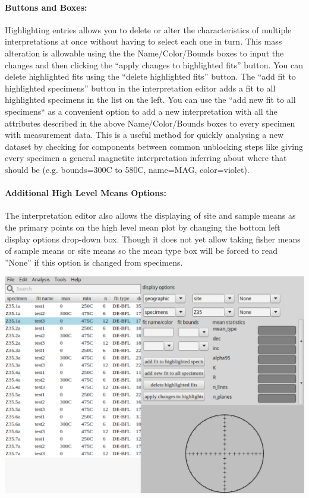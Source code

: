 \documentclass[11pt]{book}
\begin{document}
{\paragraph{Buttons and Boxes:}\label{IE-buttons} Highlighting entries allows you to delete or alter the characteristics of multiple interpretations at once without having to select each one in turn. This mass alteration is allowable using the the Name/Color/Bounds boxes to input the changes and then clicking the ``apply changes to highlighted fits'' button. You can delete highlighted fits using the ``delete highlighted fits'' button. The ``add fit to highlighted specimens'' button in the interpretation editor adds a fit to all highlighted specimens in the list on the left. You can use the ``add new fit to all specimens`` as a convenient option to add a new interpretation with all the attributes described in the above Name/Color/Bounds boxes to every specimen with measurement data. This is a useful method for quickly analysing a new dataset by checking for components between common unblocking steps like giving every specimen a general magnetite interpretation inferring about where that should be (e.g. bounds=300C to 580C, name=MAG, color=violet).
\paragraph{Additional High Level Means Options:}\label{IE-HLM-options} The interpretation editor also allows the displaying of site and sample means as the primary points on the high level mean plot by changing the bottom left display options drop-down box. Though it does not yet allow taking fisher means of sample means or site means so the mean type box will be forced to read ''None'' if this option is changed from specimens.

\includegraphics[width=15 cm]{EPSFiles/demag_gui_InterpEditor.eps}

}
\end{document}
